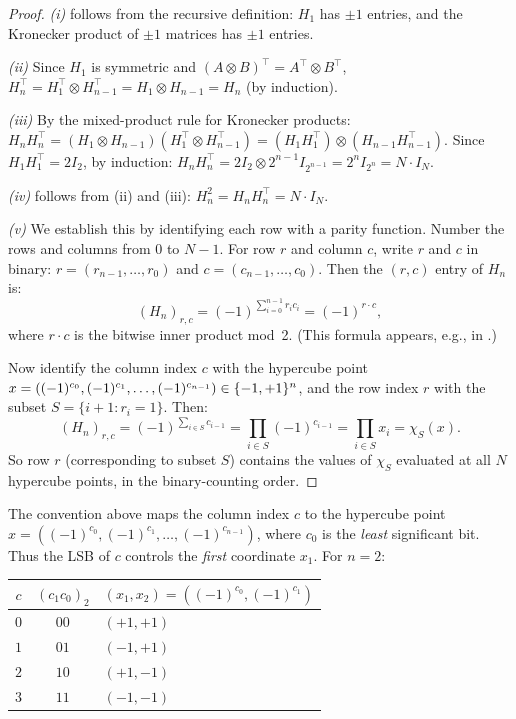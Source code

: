 \begin{proof}
\emph{(i)} follows from the recursive definition: $H_1$ has $\pm 1$
entries, and the Kronecker product of $\pm 1$ matrices has $\pm 1$ entries.

\emph{(ii)} Since $H_1$ is symmetric and $(A \otimes B)^\top = A^\top \otimes B^\top$,
$H_n^\top = H_1^\top \otimes H_{n-1}^\top = H_1 \otimes H_{n-1} = H_n$
(by induction).

\emph{(iii)} By the mixed-product rule for Kronecker products:
$H_n H_n^\top = (H_1 \otimes H_{n-1})(H_1^\top \otimes H_{n-1}^\top)
= (H_1 H_1^\top) \otimes (H_{n-1} H_{n-1}^\top)$.
Since $H_1 H_1^\top = 2I_2$, by induction:
$H_n H_n^\top = 2I_2 \otimes 2^{n-1} I_{2^{n-1}} = 2^n I_{2^n} = N \cdot I_N$.

\emph{(iv)} follows from (ii) and (iii): $H_n^2 = H_n H_n^\top = N \cdot I_N$.

\emph{(v)} We establish this by identifying each row with a parity
function. Number the rows and columns from $0$ to $N-1$. For row $r$
and column $c$, write $r$ and $c$ in binary: $r = (r_{n-1}, \ldots, r_0)$
and $c = (c_{n-1}, \ldots, c_0)$. Then the $(r,c)$ entry of $H_n$ is:
\begin{equation}\label{eq:hadamard-entry}
  (H_n)_{r,c} = (-1)^{\sum_{i=0}^{n-1} r_i c_i}
  = (-1)^{r \cdot c},
\end{equation}
where $r \cdot c$ is the bitwise inner product mod~2.
(This formula appears, e.g., in \citealp[Chapter~1]{horadam2007hadamard}.)

Now identify the column index $c$ with the hypercube point
$x = ((-1)^{c_0}, (-1)^{c_1}, \ldots, (-1)^{c_{n-1}}) \in \{-1,+1\}^n$,
and the row index $r$ with the subset $S = \{i+1 : r_i = 1\}$. Then:
\[
  (H_n)_{r,c} = (-1)^{\sum_{i \in S} c_{i-1}} = \prod_{i \in S} (-1)^{c_{i-1}} = \prod_{i \in S} x_i = \chi_S(x).
\]
So row $r$ (corresponding to subset $S$) contains the values of $\chi_S$
evaluated at all $N$ hypercube points, in the binary-counting order.
\end{proof}

\begin{remark}\label{rem:binary-order}
The convention above maps the column index $c$ to the hypercube point
$x = ((-1)^{c_0}, (-1)^{c_1}, \ldots, (-1)^{c_{n-1}})$, where
$c_0$ is the \emph{least} significant bit. Thus the LSB of $c$
controls the \emph{first} coordinate $x_1$. For $n = 2$:

\begin{center}
\begin{tabular}{ccl}
\toprule
$c$ & $(c_1 c_0)_2$ & $(x_1, x_2) = ((-1)^{c_0}, (-1)^{c_1})$ \\
\midrule
$0$ & $00$ & $(+1, +1)$ \\
$1$ & $01$ & $(-1, +1)$ \\
$2$ & $10$ & $(+1, -1)$ \\
$3$ & $11$ & $(-1, -1)$ \\
\bottomrule
\end{tabular}
\end{center}
\end{remark}


